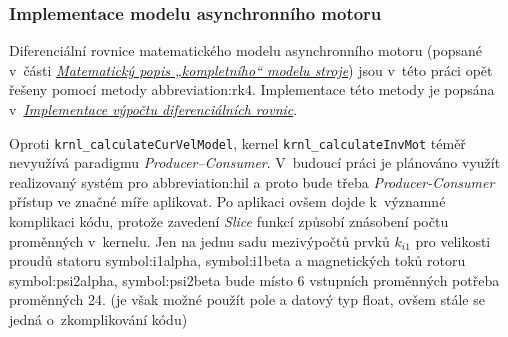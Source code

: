 \documentclass[a4paper, twoside, 11pt]{article}
\newcommand{\fbar}{\FloatBarrier}
\begin{document}
		\subsubsection{Implementace modelu asynchronního motoru}
			Diferenciální rovnice matematického modelu asynchronního motoru (popsané v~části \hyperref[subsec:matematicky-popis-kompletniho-modelu-stroje]{\textit{Matematický popis „kompletního“ modelu stroje}}) jsou v~této práci opět řešeny pomocí metody \gls{abbreviation:rk4}. Implementace této metody je popsána v~\hyperref[subsubsec:implementace-vypoctu-diferencialnich-rovnic]{\textit{Implementace výpočtu diferenciálních rovnic}}.\par
			Oproti \texttt{krnl\_calculateCurVelModel}, kernel \texttt{krnl\_calculateInvMot} téměř nevyužívá paradigmu \textit{Producer–Consumer}. V~budoucí práci je plánováno využít realizovaný systém pro \gls{abbreviation:hil} a proto bude třeba \textit{Producer-Consumer} přístup ve značné míře aplikovat. Po aplikaci ovšem dojde k~významné komplikaci kódu, protože zavedení \textit{Slice} funkcí způsobí znásobení počtu proměnných v~kernelu. Jen na jednu sadu mezivýpočtů prvků $k_{i1}$ pro velikosti proudů statoru \gls{symbol:i1alpha}, \gls{symbol:i1beta} a magnetických toků rotoru \gls{symbol:psi2alpha}, \gls{symbol:psi2beta} bude místo 6 vstupních proměnných potřeba proměnných 24. (je však možné použít pole a datový typ float, ovšem stále se jedná o~zkomplikování kódu)\par


	\fbar
\end{document}
